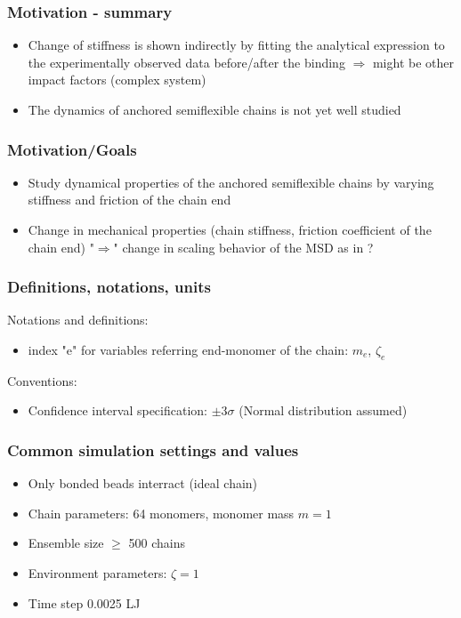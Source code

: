 \documentclass[handout]{beamer}
\begin{document}
\begin{frame}
\end{frame}

\begin{frame}
    \frametitle{Motivation - summary}
    \begin{itemize}
        \item Change of stiffness is shown indirectly by fitting the 
        analytical expression to the experimentally observed data before/after
        the binding $\Rightarrow$ might be other impact factors (complex system)
        \item The dynamics of anchored semiflexible chains is not yet well studied 
    \end{itemize} 
\end{frame}

\begin{frame}
    \frametitle{Motivation/Goals}

    \begin{itemize}
        \item Study dynamical properties of the anchored
        semiflexible chains by varying stiffness and friction of the chain end
        \item Change in mechanical properties (chain stiffness, friction coefficient of the chain end)
        "$\Rightarrow$" change in scaling behavior of the MSD as in \cite{Singh:2022}? 
    \end{itemize}

\end{frame}

\begin{frame}
    \frametitle{Definitions, notations, units}

    Notations and definitions:

    \begin{itemize}
        \item index "e" for variables referring end-monomer of the chain: $m_e$, $\zeta_e$ 
    \end{itemize}
    \vspace{1cm}
    Conventions:
    \begin{itemize}
        \item Confidence interval specification: $\pm 3\sigma$ (Normal distribution assumed)
    \end{itemize}
\end{frame}
    
\begin{frame}
    \frametitle{Common simulation settings and values}

    \begin{itemize}
        \item Only bonded beads interract (ideal chain)
        \item Chain parameters: 64 monomers, monomer mass $m=1$
        \item Ensemble size $ \ge $ 500 chains
        \item Environment parameters: $\zeta=1$
        \item Time step 0.0025 LJ
    \end{itemize}

\end{frame}
\end{document}
